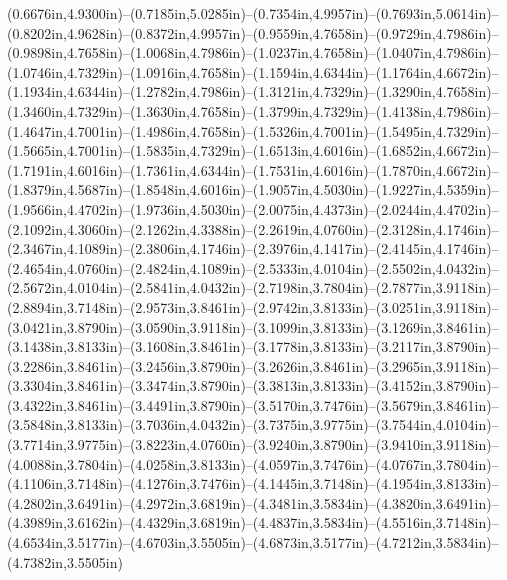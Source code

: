 (0.6676in,4.9300in)--(0.7185in,5.0285in)--(0.7354in,4.9957in)--(0.7693in,5.0614in)--(0.8202in,4.9628in)--(0.8372in,4.9957in)--(0.9559in,4.7658in)--(0.9729in,4.7986in)--(0.9898in,4.7658in)--(1.0068in,4.7986in)--(1.0237in,4.7658in)--(1.0407in,4.7986in)--(1.0746in,4.7329in)--(1.0916in,4.7658in)--(1.1594in,4.6344in)--(1.1764in,4.6672in)--(1.1934in,4.6344in)--(1.2782in,4.7986in)--(1.3121in,4.7329in)--(1.3290in,4.7658in)--(1.3460in,4.7329in)--(1.3630in,4.7658in)--(1.3799in,4.7329in)--(1.4138in,4.7986in)--(1.4647in,4.7001in)--(1.4986in,4.7658in)--(1.5326in,4.7001in)--(1.5495in,4.7329in)--(1.5665in,4.7001in)--(1.5835in,4.7329in)--(1.6513in,4.6016in)--(1.6852in,4.6672in)--(1.7191in,4.6016in)--(1.7361in,4.6344in)--(1.7531in,4.6016in)--(1.7870in,4.6672in)--(1.8379in,4.5687in)--(1.8548in,4.6016in)--(1.9057in,4.5030in)--(1.9227in,4.5359in)--(1.9566in,4.4702in)--(1.9736in,4.5030in)--(2.0075in,4.4373in)--(2.0244in,4.4702in)--(2.1092in,4.3060in)--(2.1262in,4.3388in)--(2.2619in,4.0760in)--(2.3128in,4.1746in)--(2.3467in,4.1089in)--(2.3806in,4.1746in)--(2.3976in,4.1417in)--(2.4145in,4.1746in)--(2.4654in,4.0760in)--(2.4824in,4.1089in)--(2.5333in,4.0104in)--(2.5502in,4.0432in)--(2.5672in,4.0104in)--(2.5841in,4.0432in)--(2.7198in,3.7804in)--(2.7877in,3.9118in)--(2.8894in,3.7148in)--(2.9573in,3.8461in)--(2.9742in,3.8133in)--(3.0251in,3.9118in)--(3.0421in,3.8790in)--(3.0590in,3.9118in)--(3.1099in,3.8133in)--(3.1269in,3.8461in)--(3.1438in,3.8133in)--(3.1608in,3.8461in)--(3.1778in,3.8133in)--(3.2117in,3.8790in)--(3.2286in,3.8461in)--(3.2456in,3.8790in)--(3.2626in,3.8461in)--(3.2965in,3.9118in)--(3.3304in,3.8461in)--(3.3474in,3.8790in)--(3.3813in,3.8133in)--(3.4152in,3.8790in)--(3.4322in,3.8461in)--(3.4491in,3.8790in)--(3.5170in,3.7476in)--(3.5679in,3.8461in)--(3.5848in,3.8133in)--(3.7036in,4.0432in)--(3.7375in,3.9775in)--(3.7544in,4.0104in)--(3.7714in,3.9775in)--(3.8223in,4.0760in)--(3.9240in,3.8790in)--(3.9410in,3.9118in)--(4.0088in,3.7804in)--(4.0258in,3.8133in)--(4.0597in,3.7476in)--(4.0767in,3.7804in)--(4.1106in,3.7148in)--(4.1276in,3.7476in)--(4.1445in,3.7148in)--(4.1954in,3.8133in)--(4.2802in,3.6491in)--(4.2972in,3.6819in)--(4.3481in,3.5834in)--(4.3820in,3.6491in)--(4.3989in,3.6162in)--(4.4329in,3.6819in)--(4.4837in,3.5834in)--(4.5516in,3.7148in)--(4.6534in,3.5177in)--(4.6703in,3.5505in)--(4.6873in,3.5177in)--(4.7212in,3.5834in)--(4.7382in,3.5505in) 